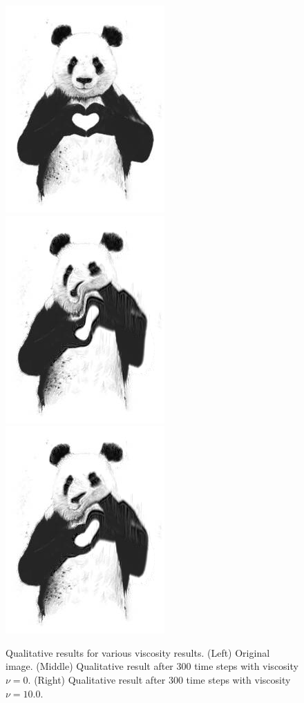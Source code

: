 \documentclass[sigconf]{acmart}
\begin{document}
\begin{figure}
    \centering
    \includegraphics[width=0.32\linewidth]{figs/panda_small.jpeg}
    \includegraphics[width=0.32\linewidth]{figs/panda_vis0.png}
    \includegraphics[width=0.32\linewidth]{figs/panda_vis10.png}
    \caption{Qualitative results for various viscosity results. (Left) Original image. (Middle) Qualitative result after 300 time steps with viscosity $\nu = 0$. (Right) Qualitative result after 300 time steps with viscosity $\nu = 10.0$.
    \label{fig:panda-vis}}
\end{figure}
\end{document}
